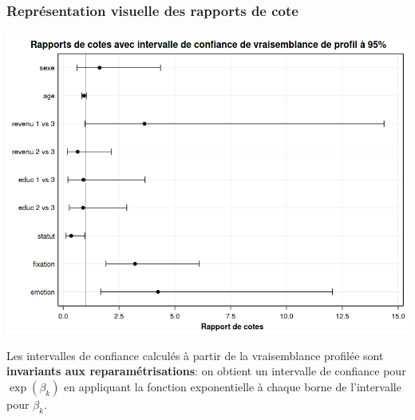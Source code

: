 \documentclass{beamer}
\begin{document}
\begin{frame}[fragile]
\frametitle{Représentation visuelle des rapports de cote}
\begin{center}
\includegraphics[width = 0.8\linewidth]{img/c4/diapos8-e16}

\end{center}
{\footnotesize 

Les intervalles de confiance calculés à partir de la vraisemblance profilée sont \textbf{invariants aux reparamétrisations}: on obtient un intervalle de confiance pour $\exp(\beta_k)$ en appliquant la fonction exponentielle à chaque borne de l'intervalle pour $\beta_k$.

}
\end{frame}
\end{document}

